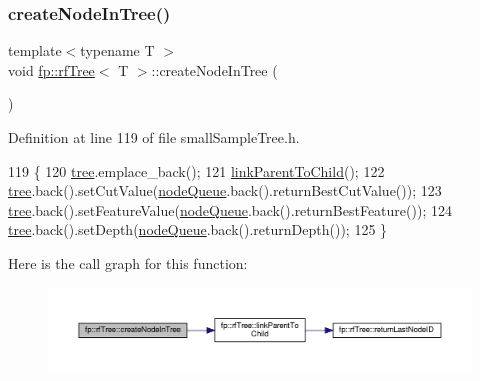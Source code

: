 \subsubsection{\texorpdfstring{create\+Node\+In\+Tree()}{createNodeInTree()}\hspace{0.1cm}{\footnotesize\ttfamily [2/2]}}
{\footnotesize\ttfamily template$<$typename T $>$ \\
void \hyperlink{classfp_1_1rfTree}{fp\+::rf\+Tree}$<$ T $>$\+::create\+Node\+In\+Tree (\begin{DoxyParamCaption}{ }\end{DoxyParamCaption})\hspace{0.3cm}{\ttfamily [inline]}}



Definition at line 119 of file small\+Sample\+Tree.\+h.


\begin{DoxyCode}
119                                               \{
120                     \hyperlink{classfp_1_1rfTree_a1d5c209715f4044a85878c17e2b3ee53}{tree}.emplace\_back();
121                     \hyperlink{classfp_1_1rfTree_aceaedc5d54bb429c1a3539f164a93d45}{linkParentToChild}();
122                     \hyperlink{classfp_1_1rfTree_a1d5c209715f4044a85878c17e2b3ee53}{tree}.back().setCutValue(\hyperlink{classfp_1_1rfTree_af72d0a2f930fd480dfb4858885c2df23}{nodeQueue}.back().returnBestCutValue());
123                     \hyperlink{classfp_1_1rfTree_a1d5c209715f4044a85878c17e2b3ee53}{tree}.back().setFeatureValue(\hyperlink{classfp_1_1rfTree_af72d0a2f930fd480dfb4858885c2df23}{nodeQueue}.back().returnBestFeature());
124                     \hyperlink{classfp_1_1rfTree_a1d5c209715f4044a85878c17e2b3ee53}{tree}.back().setDepth(\hyperlink{classfp_1_1rfTree_af72d0a2f930fd480dfb4858885c2df23}{nodeQueue}.back().returnDepth());
125                 \}
\end{DoxyCode}
Here is the call graph for this function\+:
\nopagebreak
\begin{figure}[H]
\begin{center}
\leavevmode
\includegraphics[width=350pt]{classfp_1_1rfTree_aaf9d8cdfbb1d10da53a375ea8204e393_cgraph}
\end{center}
\end{figure}
\mbox{\label{classfp_1_1rfTree_a51da8e4a46582b26643a4ae392230e77}} 
